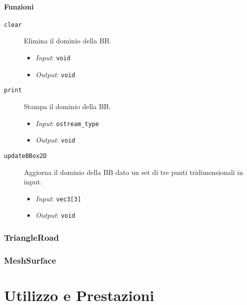 \paragraph{Funzioni}
\begin{description}
	\item[\texttt{clear}] Elimina il dominio della \ac{BB}.
	\begin{itemize}
		\item \textit{Input}: \texttt{void}
		\item \textit{Output}: \texttt{void}
	\end{itemize}
	\item[\texttt{print}] Stampa il dominio della \ac{BB}.
	\begin{itemize}
		\item \textit{Input}: \texttt{ostream\_type}
		\item \textit{Output}: \texttt{void}
	\end{itemize}
	\item[\texttt{updateBBox2D}] Aggiorna il dominio della \ac{BB} dato un set di tre punti tridimensionali in input.
	\begin{itemize}
		\item \textit{Input}: \texttt{vec3[3]}
		\item \textit{Output}: \texttt{void}
	\end{itemize}
\end{description}
%
\subsubsection{TriangleRoad}
\subsubsection{MeshSurface}


\section{Utilizzo e Prestazioni}

